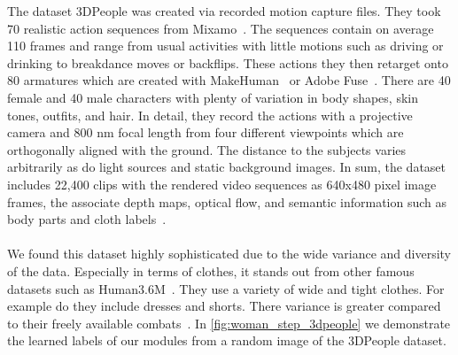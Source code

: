 The dataset 3DPeople was created via recorded motion capture files.
They took 70 realistic action sequences from Mixamo~\cite{mixamomotionpac}.
The sequences contain on average 110 frames and range from usual activities with little motions such as driving
or drinking to breakdance moves or backflips.
These actions they then retarget onto 80 armatures which are created with MakeHuman~\cite{makehuman} or Adobe
Fuse~\cite{adobefuse}.
There are 40 female and 40 male characters with plenty of variation in body shapes, skin tones, outfits, and hair.
In detail, they record the actions with a projective camera and 800 nm focal length from four different viewpoints
which are orthogonally aligned with the ground.
The distance to the subjects varies arbitrarily as do light sources and static background images.
In sum, the dataset includes 22,400 clips with the rendered video sequences as 640x480 pixel image frames, the associate
depth maps, optical flow, and semantic information such as body parts and cloth labels~\cite{3dpeople}.
\\\mbox{}\\
We found this dataset highly sophisticated due to the wide variance and diversity of the data.
Especially in terms of clothes, it stands out from other famous datasets such as Human3.6M~\cite{humaneva}.
They use a variety of wide and tight clothes. For example do they include dresses and shorts.
There variance is greater compared to their freely available combats~\cite{human36m, humaneva}.
In \autoref{fig:woman_step_3dpeople} we demonstrate the learned labels of our modules from a random image of the
3DPeople dataset.





